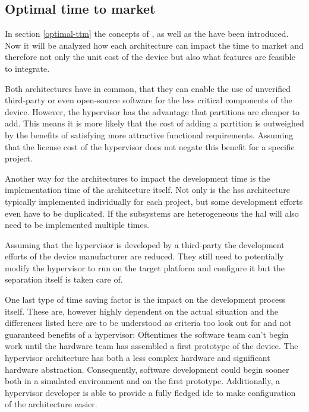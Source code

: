 \subsection{Optimal time to market}
In section \ref{optimal-ttm} the concepts of , as well as the have been introduced. Now it will be analyzed how each architecture can impact the time to market and therefore not only the unit cost of the device but also what features are feasible to integrate.

Both architectures have in common, that they can enable the use of unverified third-party or even open-source software for the less critical  components of the device. However, the hypervisor has the advantage that partitions are cheaper to add. This means it is more likely that the cost of adding a partition is outweighed by the benefits of satisfying more attractive functional requirements. Assuming that the license cost of the hypervisor does not negate this benefit for a specific project.

Another way for the architectures to impact the development time is the implementation time of the architecture itself. Not only is the \acrshort{hss} architecture typically implemented individually for each project, but some development efforts even have to be duplicated. If the subsystems are heterogeneous the \acrfull{hal} will also need to be implemented multiple times. 

Assuming that the hypervisor is developed by a third-party the development efforts of the device manufacturer are reduced. They still need to potentially modify the hypervisor to run on the target platform and configure it but the separation itself is taken care of.

One last type of time saving factor is the impact on the development process itself. These are, however highly dependent on the actual situation and the differences listed here are to be understood as criteria too look out for and not guaranteed benefits of a hypervisor: Oftentimes the software team can't begin work until the hardware team has assembled a first prototype of the device. The hypervisor architecture has both a less complex hardware and significant hardware abstraction. Consequently, software development could begin sooner both in a simulated environment and on the first prototype. Additionally, a hypervisor developer is able to provide a fully fledged \acrshort{ide} to make configuration of the architecture easier.

